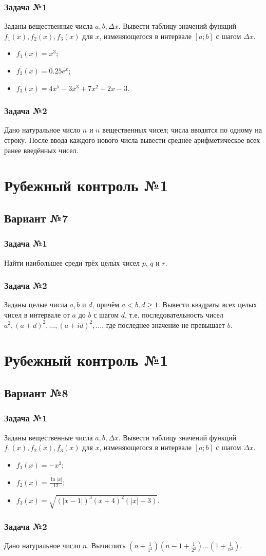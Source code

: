 \documentclass[12pt,a5paper,landscape]{article}
\begin{document}
\subsubsection*{Задача №1}
Заданы вещественные числа $a, b, \Delta x$. Вывести таблицу значений функций $f_1(x), f_2(x), f_3(x)$ для $x$, изменяющегося в интервале $[a;b]$ с шагом $\Delta x$.
\begin{itemize}
\item $f_1(x) = x^3$;
\item $f_2(x) = 0.25e^{x}$;
\item $f_3(x) = 4x^5 - 3x^3 +7x^2+2x-3$.
\end{itemize}
\subsubsection*{Задача №2}
Дано натуральное число $n$ и $n$ вещественных чисел; числа вводятся по одному на строку. После ввода каждого нового числа вывести среднее арифметическое всех ранее введённых чисел.


\clearpage
\section*{Рубежный контроль №1}
\subsection*{Вариант №7}
\subsubsection*{Задача №1}
Найти наибольшее среди трёх целых чисел $p$, $q$ и $r$.
\subsubsection*{Задача №2}
Заданы целые числа $a, b$ и $d$, причём $a < b, d \ge 1$. Вывести квадраты всех целых чисел в интервале от $a$ до $b$ с шагом $d$, т.е. последовательность чисел $a^2, (a+d)^2, \ldots, (a + id)^2, \ldots$, где последнее значение не превышает $b$.


\clearpage
\section*{Рубежный контроль №1}
\subsection*{Вариант №8}
\subsubsection*{Задача №1}
Заданы вещественные числа $a, b, \Delta x$. Вывести таблицу значений функций $f_1(x), f_2(x), f_3(x)$ для $x$, изменяющегося в интервале $[a;b]$ с шагом $\Delta x$.
\begin{itemize}
\item $f_1(x) = -x^2$;
\item $f_2(x) = \frac {\ln |x|} {12} $;
\item $f_3(x) = \sqrt { (|x-1|)^3(x+4)^2(|x|+3) }$.
\end{itemize}
\subsubsection*{Задача №2}
Дано натуральное число $n$. Вычислить $(n + \frac{1}{1^2})(n-1 + \frac{1}{2^2}) \ldots (1 + \frac{1}{n^2})$.
\end{document}
